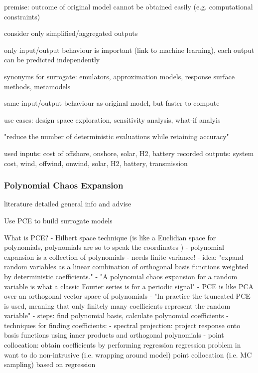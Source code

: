 premise: outcome of original model cannot be obtained easily (e.g. computational constraints)

consider only simplified/aggregated outputs

only input/output behaviour is important (link to machine learning), each output can be predicted independently

synonyms for surrogate: emulators, approximation models, response surface methods, metamodels

same input/output behaviour as original model, but faster to compute

use cases: design space exploration, sensitivity analysis, what-if analyis

"reduce the number of deterministic evaluations while retaining accuracy" \cite{palar_multi-fidelity_2016}

used inputs: cost of offshore, onshore, solar, H2, battery
recorded outputs: system cost, wind, offwind, onwind, solar, H2, battery, transmission

\subsubsection{Polynomial Chaos Expansion}

literature
detailed general info and advise
\cite{gratiet_metamodel-based_2015} 
\cite{sudret_global_2008}
\cite{fajraoui_optimal_2017}
\cite{marelli_uqlab_nodate}


Use PCE to build surrogate models \cite{sudret_global_2008}

What is PCE?
- Hilbert space technique (is like a Euclidian space for polynomials, polynomials are so to speak the coordinates \cite{gratiet_metamodel-based_2015})
- polynomial expansion is a collection of polynomials
- needs finite variance!
- idea: "expand random variables as a linear combination of orthogonal basis functions weighted by deterministic coefficients." \cite{muhlpfordt_uncertainty_2020}
- "A polynomial chaos expansion for a random variable is what a classic Fourier series is for a periodic signal" \cite{muhlpfordt_uncertainty_2020}
- PCE is like PCA over an orthogonal vector space of polynomials
- "In practice the truncated PCE is used, meaning that only finitely many coefficients represent the random variable" \cite{muhlpfordt_uncertainty_2020}
- steps: find polynomial basis, calculate polynomial coefficients
- techniques for finding coefficients:
  - spectral projection: project response onto basis functions using inner products and orthogonal polynomials \cite{palar_multi-fidelity_2016}
  - point collocation: obtain coefficients by performing  regression \cite{palar_multi-fidelity_2016} regression problem in \cite{fajraoui_optimal_2017}
want to do non-intrusive (i.e. wrapping around model) point collocation (i.e. MC sampling) based on regression \cite{ng_multifidelity_2012}

